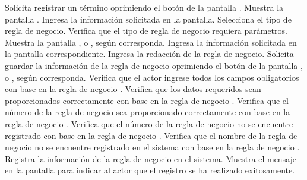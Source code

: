 	\begin{UCtrayectoria}
		\UCpaso[\UCactor] Solicita registrar un término oprimiendo el botón  de la pantalla .
		\UCpaso[\UCsist] Muestra la pantalla .
		\UCpaso[\UCactor] Ingresa la información solicitada en la pantalla. \label{CU8.1-P3}
		\UCpaso[\UCactor] Selecciona el tipo de regla de negocio.
		\UCpaso[\UCsist] Verifica que el tipo de regla de negocio requiera parámetros. 
		\UCpaso[\UCsist] Muestra la pantalla ,  o , según corresponda.
		\UCpaso[\UCsist] Ingresa la información solicitada en la pantalla correspondiente.
		\UCpaso[\UCsist] Ingresa la redacción de la regla de negocio. \label{CU8.1-P9}
		\UCpaso[\UCactor] Solicita guardar la información de la regla de negocio oprimiendo el botón  de la pantalla ,  o , según corresponda. 
		\UCpaso[\UCsist] Verifica que el actor ingrese todos los campos obligatorios con base en la regla de negocio . 
		\UCpaso[\UCsist] Verifica que los datos requeridos sean proporcionados correctamente con base en la regla de negocio .  
		\UCpaso[\UCsist] Verifica que el número de la regla de negocio sea proporcionado correctamente con base en la regla de negocio . 
		\UCpaso[\UCsist] Verifica que el número de la regla de negocio no se encuentre registrado con base en la regla de negocio . 
		\UCpaso[\UCsist] Verifica que el nombre de la regla de negocio no se encuentre registrado en el sistema con base en la regla de negocio . 
		\UCpaso[\UCsist] Registra la información de la regla de negocio en el sistema.
		\UCpaso[\UCsist] Muestra el mensaje  en la pantalla  para indicar al actor que el registro se ha realizado exitosamente.
	\end{UCtrayectoria}		
	
